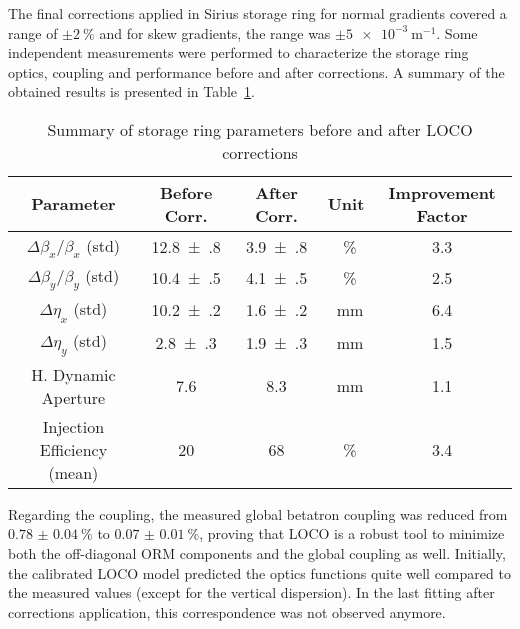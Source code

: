     The final corrections applied in Sirius storage ring for normal gradients covered a range of $\pm\SI{2}{\%}$ and for skew gradients, the range was $\pm\SI{5e-3}{\meter^{-1}}$. Some independent measurements were performed to characterize the storage ring optics, coupling and performance before and after corrections. A summary of the obtained results is presented in Table~\ref{tab:params_corr_summary}.
\begin{table}[h!]
    \centering
    \caption{Summary of storage ring parameters before and after LOCO corrections}
    \label{tab:params_corr_summary}
    \begin{tabular}{ccccc}
        \toprule\toprule
        Parameter & Before Corr. & After Corr. & Unit & Improvement Factor\\
        \hline
        $\Delta\beta_x/\beta_x$ (std) & \num{12.8(8)} & \num{3.9(8)} & \SI{}{\%} & \num{3.3} \\
        $\Delta\beta_y/\beta_y$ (std) & \num{10.4(5)} & \num{4.1(5)} & \SI{}{\%} & \num{2.5} \\
        $\Delta\eta_x$ (std) &  \num{10.2(2)} &  \num{1.6(2)} & \SI{}{\milli\meter} & \num{6.4} \\
        $\Delta\eta_y$ (std) &  \num{2.8(3)} &  \num{1.9(3)} & \SI{}{\milli\meter}& \num{1.5} \\
        H. Dynamic Aperture  & \num{7.6} & \num{8.3} & \SI{}{\milli\meter} & \num{1.1} \\
        Injection Efficiency (mean)  & \num{20} & \num{68} & \SI{}{\%} & \num{3.4} \\
        \bottomrule\bottomrule
    \end{tabular}
\end{table}

Regarding the coupling, the measured global betatron coupling was reduced from $\SI{0.78(4)}{\%}$ to $\SI{0.07(1)}{\%}$, proving that LOCO is a robust tool to minimize both the off-diagonal ORM components and the global coupling as well. Initially, the calibrated LOCO model predicted the optics functions quite well compared to the measured values (except for the vertical dispersion). In the last fitting after corrections application, this correspondence was not observed anymore. 

